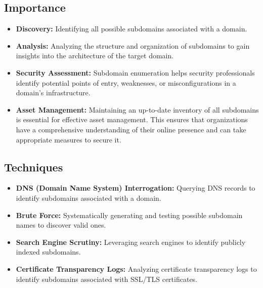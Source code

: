 \documentclass[12pt]{article}
\begin{document}
\subsection{Importance}\label{subsec:importance}
\begin{itemize}
    \item \textbf{Discovery:} Identifying all possible subdomains associated with a domain.
    \item \textbf{Analysis:} Analyzing the structure and organization of subdomains to gain insights into the architecture of the target domain.
    \item \textbf{Security Assessment:} Subdomain enumeration helps security professionals identify potential points of entry, weaknesses, or misconfigurations in a domain's infrastructure.
    \item \textbf{Asset Management:} Maintaining an up-to-date inventory of all subdomains is essential for effective asset management. This ensures that organizations have a comprehensive understanding of their online presence and can take appropriate measures to secure it.
\end{itemize}

\subsection{Techniques}\label{subsec:techniques}
\begin{itemize}
    \item \textbf{DNS (Domain Name System) Interrogation:} Querying DNS records to identify subdomains associated with a domain.
    \item \textbf{Brute Force:} Systematically generating and testing possible subdomain names to discover valid ones.
    \item \textbf{Search Engine Scrutiny:} Leveraging search engines to identify publicly indexed subdomains.
    \item \textbf{Certificate Transparency Logs:} Analyzing certificate transparency logs to identify subdomains associated with SSL/TLS certificates.
\end{itemize}
\end{document}
